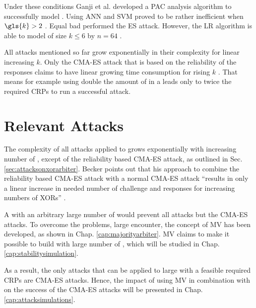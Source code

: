 Under these conditions Ganji et al. developed a \ac{PAC} analysis algorithm to successfully model \xpufs \cite{Ganji2015WhyPUFs}.
Using \ac{ANN} and \ac{SVM} proved to be rather inefficient when $\gls{k} > 2$ \cite{Hospodar2012MachineUsability}.
Equal bad performed the \ac{ES} attack.
However, the \ac{LR} algorithm is able to model \xpufs of size $k \le 6$ by $n = 64$ \cite{Ruhrmair2010ModelingFunctions}.

All attacks mentioned so far grow exponentially in their complexity for linear increasing $k$.
Only the \ac{CMA-ES} attack that is based on the reliability of the responses claims to have linear growing time consumption for rising $k$ \cite{Becker2015ThePUFs}.
That means for example using double the amount of \apufs in a \xpufs leads only to twice the required \acp{CRP} to run a successful attack.


\section{Relevant Attacks}
\label{sec:essentialattacks}

The complexity of all attacks applied to \xpufs grows exponentially with increasing number of \apuf, except of the reliability based \ac{CMA-ES} attack, as outlined in Sec. \ref{sec:attacksonxorarbiter}.
Becker points out that his approach to combine the reliability based \ac{CMA-ES} attack with a normal \ac{CMA-ES} attack ``results in only a linear increase in needed number of challenge and responses for increasing numbers of XORs'' \cite{Becker2015ThePUFs}.

A \xpuf with an arbitrary large number of \apufs would prevent all attacks but the \ac{CMA-ES} attacks.
To overcome the problems, large \xpufs encounter, the concept of \ac{MV} has been developed, as shown in Chap. \ref{cap:majorityarbiter}.
\ac{MV} claims to make it possible to build \xpufs with large number of \apufs, which will be studied in Chap. \ref{cap:stabilitysimulation}.

As a result, the only attacks that can be applied to large \xpufs with a feasible required \acp{CRP} are \ac{CMA-ES} attacks.
Hence, the impact of using \ac{MV} in combination with \apufs on the success of the \ac{CMA-ES} attacks will be presented in Chap. \ref{cap:attacksimulations}.

